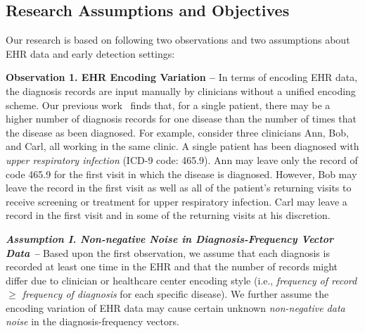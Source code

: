 \subsection{Research Assumptions and Objectives}

Our research is based on following two  observations and two assumptions about EHR data and early detection settings:

\textbf{Observation 1.  EHR Encoding Variation -- }  In terms of encoding EHR data, the diagnosis records are input manually by clinicians without a unified encoding scheme.
Our previous work~\cite{alicia2015evaluating} finds that, for a single patient, there may be a higher number of diagnosis records for one disease than the number of times that the disease as been diagnosed.
For example, consider three clinicians  Ann,  Bob, and Carl, all working in the same  clinic.
A single patient has been  diagnosed with \emph{upper respiratory infection} (ICD-9 code:  465.9).
Ann may leave only the record of code 465.9 for the first visit  in which the disease is diagnosed.
However,  Bob may leave the  record in the first visit as well as all of the patient's  returning visits to receive  screening or treatment  for  upper respiratory infection.
Carl may leave a record in the first visit and in some of the returning visits at his discretion.



\textbf{\em Assumption I.  Non-negative Noise in Diagnosis-Frequency Vector Data -- } Based upon the first observation, we assume that each diagnosis is recorded at least one time in the EHR and that the number of records might differ due to clinician or healthcare center encoding style (i.e., \emph{frequency of record $\geq$ frequency of diagnosis} for each specific disease).
We further assume the encoding variation of EHR data may cause certain unknown \emph{non-negative data noise} in the diagnosis-frequency vectors.
 

